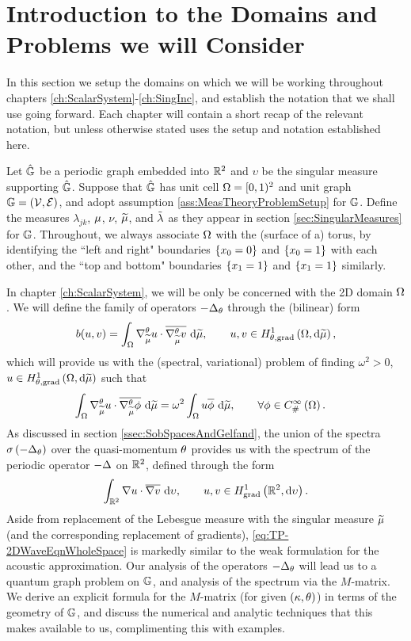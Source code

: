 \section{Introduction to the Domains and Problems we will Consider} \label{sec:TP-DomainSetup}
In this section we setup the domains on which we will be working throughout chapters \ref{ch:ScalarSystem}-\ref{ch:SingInc}, and establish the notation that we shall use going forward.
Each chapter will contain a short recap of the relevant notation, but unless otherwise stated uses the setup and notation established here.

Let $\hat{\mathbb{G}}$ be a periodic graph embedded into $\mathbb{R}^2$ and $\upsilon$ be the singular measure supporting $\hat{\mathbb{G}}$.
Suppose that $\hat{\mathbb{G}}$ has unit cell $\Omega=[0,1)^2$ and unit graph $\mathbb{G}=\left( \mathcal{V}, \mathcal{E} \right)$, and adopt assumption \ref{ass:MeasTheoryProblemSetup} for $\mathbb{G}$.
Define the measures $\lambda_{jk}$, $\mu$, $\nu$, $\widetilde{\mu}$, and $\tilde{\lambda}$ as they appear in section \ref{sec:SingularMeasures} for $\mathbb{G}$.
Throughout, we always associate $\Omega$ with the (surface of a) torus, by identifying the ``left and right" boundaries $\left\{ x_0=0 \right\}$ and $\left\{ x_0=1 \right\}$ with each other, and the ``top and bottom" boundaries $\left\{ x_1=1 \right\}$ and $\left\{ x_1=1 \right\}$ similarly.

In chapter \ref{ch:ScalarSystem}, we will be only be concerned with the 2D domain $\Omega$.
We will define the family of operators $-\Delta_{\theta}$ through the (bilinear) form 
\begin{align*}
	b(u,v) = \int_{\Omega} \nabla^{\theta}_{\widetilde{\mu}} u\cdot\overline{\nabla^{\theta}_{\widetilde{\mu}} v}  \ \mathrm{d}\widetilde{\mu},
	\qquad u,v\in H^1_{\theta, \mathrm{grad}}\left( \Omega, \mathrm{d}\widetilde{\mu} \right),
\end{align*}
which will provide us with the (spectral, variational) problem of finding $\omega^2>0$, $u\in H^1_{\theta, \mathrm{grad}}\left( \Omega, \mathrm{d}\widetilde{\mu} \right)$ such that
\begin{align*}
	\int_{\Omega} \nabla^{\theta}_{\widetilde{\mu}} u\cdot\overline{\nabla^{\theta}_{\widetilde{\mu}}\phi}  \ \mathrm{d}\widetilde{\mu}
	&= \omega^2\int_{\Omega} u\overline{\phi}  \ \mathrm{d}\widetilde{\mu},
	\qquad\forall\phi\in C^{\infty}_{\#}\left( \Omega \right).
\end{align*}
As discussed in section \ref{ssec:SobSpacesAndGelfand}, the union of the spectra $\sigma\left( -\Delta_{\theta} \right)$ over the quasi-momentum $\theta$ provides us with the spectrum of the periodic operator $-\Delta$ on $\mathbb{R}^2$, defined through the form
\begin{align} \label{eq:TP-2DWaveEqnWholeSpace}
	\int_{\mathbb{R}^2} \nabla u\cdot\overline{\nabla v}  \ \mathrm{d}\upsilon,
	\qquad u,v\in H^1_\mathrm{grad}\left( \mathbb{R}^2, \mathrm{d}\upsilon \right).
\end{align}
Aside from replacement of the Lebesgue measure with the singular measure $\widetilde{\mu}$ (and the corresponding replacement of gradients), \eqref{eq:TP-2DWaveEqnWholeSpace} is markedly similar to the weak formulation for the acoustic approximation.
Our analysis of the operators $-\Delta_{\theta}$ will lead us to a quantum graph problem on $\mathbb{G}$, and analysis of the spectrum via the $M$-matrix.
We derive an explicit formula for the $M$-matrix (for given $\left( \kappa, \theta \right)$) in terms of the geometry of $\mathbb{G}$, and discuss the numerical and analytic techniques that this makes available to us, complimenting this with examples.

